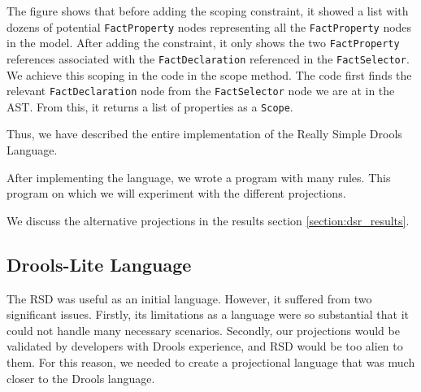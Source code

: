 The figure shows that before adding the scoping constraint, it showed a list with dozens of potential \texttt{FactProperty} nodes representing all the \texttt{FactProperty} nodes in the model.
After adding the constraint, it only shows the two \texttt{FactProperty} references associated with the \texttt{FactDeclaration} referenced in the \texttt{FactSelector}.
We achieve this scoping in the code in the scope method.
The code first finds the relevant \texttt{FactDeclaration} node from the \texttt{FactSelector} node we are at in the AST.
From this, it returns a list of properties as a \texttt{Scope}.

Thus, we have described the entire implementation of the Really Simple Drools Language.

After implementing the language, we wrote a program with many rules.
This program on which we will experiment with the different projections.

We discuss the alternative projections in the results section \ref{section:dsr_results}.

\newpage
\subsection{Drools-Lite Language}
\label{section:DroolsLite}

The RSD was useful as an initial language. 
However, it suffered from two significant issues.
Firstly, its limitations as a language were so substantial that it could not handle many necessary scenarios.
Secondly, our projections would be validated by developers with Drools experience, and RSD would be too alien to them.
For this reason, we needed to create a projectional language that was much closer to the Drools language.

